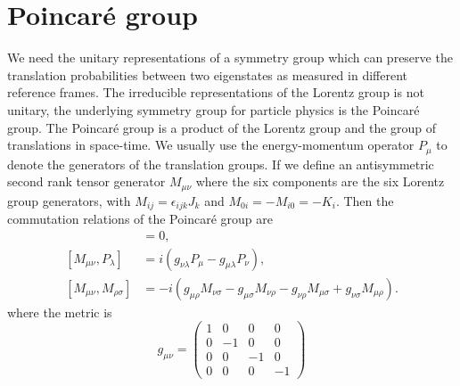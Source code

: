 \documentclass[12pt]{report}
\begin{document}
\section{Poincar\'{e} group}
We need the unitary representations of a symmetry group which can preserve the translation probabilities between two eigenstates as measured in different reference frames.
The irreducible representations of the Lorentz group is not unitary, the underlying symmetry group for particle physics is the Poincar\'{e} group.
The Poincar\'{e} group is a product of the Lorentz group and the group of translations in space-time.
We usually use the energy-momentum operator $P_{\mu}$ to denote the generators of the translation groups.
If we define an antisymmetric second rank tensor generator $M_{\mu\nu}$ where the six components are the six Lorentz group generators, with $M_{ij} = \epsilon_{ijk} J_{k}$ and $M_{0i} = - M_{i0} = -K_{i}$.
Then the commutation relations of the Poincar\'{e} group are
\begin{align}
[P_{\mu}, P_{\nu}] &= 0 ,\\
[M_{\mu \nu}, P_{\lambda}] &= i (g_{\nu \lambda} P_{\mu} - g_{\mu \lambda} P_{\nu}) ,\\
[M_{\mu \nu}, M_{\rho \sigma}] &= -i (g_{\mu \rho} M_{\nu \sigma} - g_{\mu \sigma} M_{\nu \rho} - g_{\nu \rho} M_{\mu \sigma} + g_{\nu \sigma} M_{\mu \rho}) .
\end{align}
where the metric is 
\[ g_{\mu \nu} =
\left(
\begin{array}{cccc}
1 & 0 & 0 & 0\\
0 & -1 & 0 & 0\\
0 & 0 & -1 & 0\\
0 & 0 & 0 & -1   
\end{array}
\right)
\]
\end{document}
